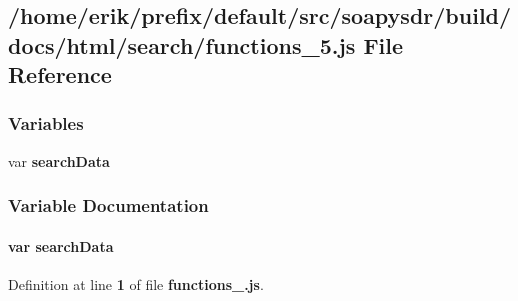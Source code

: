 \subsection{/home/erik/prefix/default/src/soapysdr/build/docs/html/search/functions\+\_\+5.js File Reference}
\label{functions__5_8js}
\subsubsection*{Variables}
\begin{DoxyCompactItemize}
\item 
var {\bf search\+Data}
\end{DoxyCompactItemize}


\subsubsection{Variable Documentation}
\paragraph[{search\+Data}]{\setlength{\rightskip}{0pt plus 5cm}var search\+Data}\label{functions__5_8js_ad01a7523f103d6242ef9b0451861231e}


Definition at line {\bf 1} of file {\bf functions\+\_.\+js}.

